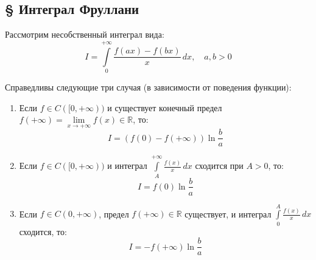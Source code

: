 \documentclass[12pt,a4paper]{article}
\begin{document}
\subsection{§ Интеграл Фруллани}

Рассмотрим несобственный интеграл вида:
$$ I = \int\limits_0^{+\infty} \frac{f(ax) - f(bx)}{x} \, dx, \quad a, b > 0 $$

Справедливы следующие три случая (в зависимости от поведения функции):
\begin{enumerate}
    \item Если $f \in C([0, +\infty))$ и существует конечный предел $f(+\infty) = \lim\limits_{x \to +\infty} f(x) \in \mathbb{R}$, то:
    $$ I = (f(0) - f(+\infty)) \ln\frac{b}{a} $$
    \item Если $f \in C([0, +\infty))$ и интеграл $\int\limits_A^{+\infty} \frac{f(x)}{x} \, dx$ сходится при $A > 0$, то:
    $$ I = f(0) \ln\frac{b}{a} $$
    \item Если $f \in C(0, +\infty)$, предел $f(+\infty) \in \mathbb{R}$ существует, и интеграл $\int\limits_0^A \frac{f(x)}{x} \, dx$ сходится, то:
    $$ I = -f(+\infty) \ln\frac{b}{a} $$
\end{enumerate}
\end{document}
